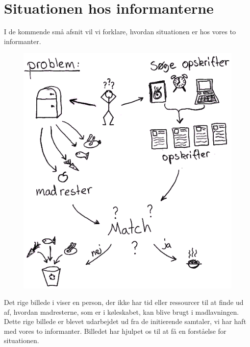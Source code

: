 \section{Situationen hos informanterne}
\label{sec:situation}

I de kommende små afsnit vil vi forklare, hvordan situationen er hos vores to informanter.

\begin{figure}
\centering
\includegraphics[scale=0.6]{billeder/rigebilleder/problemomraade.png}
\label{fig:rigbillede1}
\end{figure}

Det rige billede i  viser en person, der ikke har tid eller ressourcer til at finde ud af, hvordan madresterne, som er i køleskabet, kan blive brugt i madlavningen. Dette rige billede er blevet udarbejdet ud fra de initierende samtaler, vi har haft med vores to informanter. Billedet har hjulpet os til at få en forståelse for situationen.

